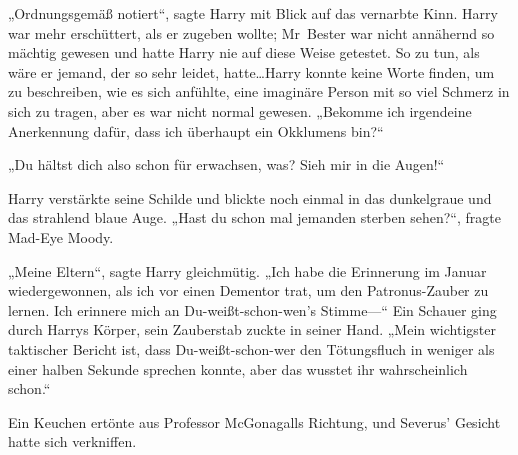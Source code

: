 „Ordnungsgemäß notiert“, sagte Harry mit Blick auf das vernarbte Kinn. Harry war mehr erschüttert, als er zugeben wollte; Mr~Bester war nicht annähernd so mächtig gewesen und hatte Harry nie auf diese Weise getestet. So zu tun, als wäre er jemand, der so sehr leidet, hatte…Harry konnte keine Worte finden, um zu beschreiben, wie es sich anfühlte, eine imaginäre Person mit so viel Schmerz in sich zu tragen, aber es war nicht normal gewesen.
„Bekomme ich irgendeine Anerkennung dafür, dass ich überhaupt ein Okklumens bin?“

„Du hältst dich also schon für erwachsen, was? Sieh mir in die Augen!“

Harry verstärkte seine Schilde und blickte noch einmal in das dunkelgraue und das strahlend blaue Auge. „Hast du schon mal jemanden sterben sehen?“, fragte Mad-Eye Moody.


„Meine Eltern“, sagte Harry gleichmütig. „Ich habe die Erinnerung im Januar wiedergewonnen, als ich vor einen Dementor trat, um den Patronus-Zauber zu lernen. Ich erinnere mich an Du-weißt-schon-wen’s Stimme—“ Ein Schauer ging durch Harrys Körper, sein Zauberstab zuckte in seiner Hand. „Mein wichtigster taktischer Bericht ist, dass Du-weißt-schon-wer den Tötungsfluch in weniger als einer halben Sekunde sprechen konnte, aber das wusstet ihr wahrscheinlich schon.“

Ein Keuchen ertönte aus Professor McGonagalls Richtung, und Severus' Gesicht hatte sich verkniffen.

